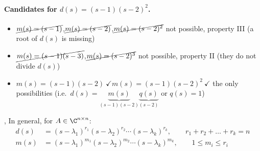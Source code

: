 \paragraph{Candidates for $d(s)=(s-1)(s-2)^2$.}
\begin{itemize}[itemsep=2pt]
\item $\cancel{m(s)=(s-1)}$,\quad $\cancel{m(s)=(s-2)}$,\quad $\cancel{m(s)=(s-2)^2}$\newline {\small$\triangleright$} not possible, property III (a root of $d(s)$ is missing)
\item $\cancel{m(s)=(s-1)(s-3)}$,\quad $\cancel{m(s)=(s-2)^3}$\newline {\small$\triangleright$} not possible, property II (they do not divide $d(s)$)
\item $m(s)=(s-1)(s-2)\ \checkmark$\qquad $m(s)=(s-1)(s-2)^2\ \checkmark$\newline {\small$\triangleright$} the only possibilities (i.e.\ $d(s)=\underbrace{m(s)}_{(s-1)(s-2)}\underbrace{q(s)}_{(s-2)}$ or $q(s)=1$)
\end{itemize}

\sep
In general, for $A\in\C^{n\times n}$:
\begin{align*}
d(s)&=(s-\lambda_1)^{r_1}(s-\lambda_2)^{r_2}\cdots(s-\lambda_k)^{r_k}, \qquad r_1+r_2+\dots+r_k=n\\
m(s)&=(s-\lambda_1)^{m_1}(s-\lambda_2)^{m_2}\cdots(s-\lambda_k)^{m_k}, \qquad \boxed{1\le m_i\le r_i}
\end{align*}

